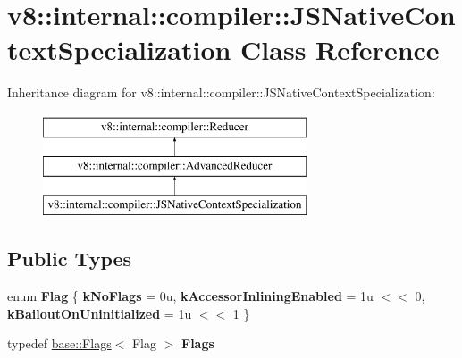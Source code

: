 \hypertarget{classv8_1_1internal_1_1compiler_1_1JSNativeContextSpecialization}{}\section{v8\+:\+:internal\+:\+:compiler\+:\+:J\+S\+Native\+Context\+Specialization Class Reference}
\label{classv8_1_1internal_1_1compiler_1_1JSNativeContextSpecialization}
Inheritance diagram for v8\+:\+:internal\+:\+:compiler\+:\+:J\+S\+Native\+Context\+Specialization\+:\begin{figure}[H]
\begin{center}
\leavevmode
\includegraphics[height=3.000000cm]{classv8_1_1internal_1_1compiler_1_1JSNativeContextSpecialization}
\end{center}
\end{figure}
\subsection*{Public Types}
\begin{DoxyCompactItemize}
\item 
\mbox{\label{classv8_1_1internal_1_1compiler_1_1JSNativeContextSpecialization_ac5300a26368d26f68369e3cacc6d6cc8}} 
enum {\bfseries Flag} \{ {\bfseries k\+No\+Flags} = 0u, 
{\bfseries k\+Accessor\+Inlining\+Enabled} = 1u $<$$<$ 0, 
{\bfseries k\+Bailout\+On\+Uninitialized} = 1u $<$$<$ 1
 \}
\item 
\mbox{\label{classv8_1_1internal_1_1compiler_1_1JSNativeContextSpecialization_a8bf4c1fac7e619700be7c15cfa75be9e}} 
typedef \mbox{\hyperlink{classv8_1_1base_1_1Flags}{base\+::\+Flags}}$<$ Flag $>$ {\bfseries Flags}
\end{DoxyCompactItemize}
